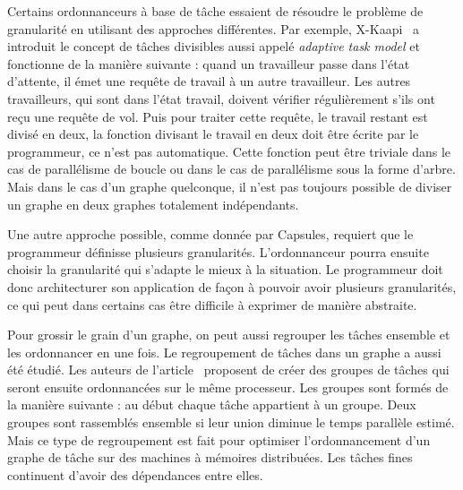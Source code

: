 Certains ordonnanceurs à base de tâche essaient de résoudre le problème de granularité en utilisant des approches différentes.
%
Par exemple, X-Kaapi~\cite{xkaapi} a introduit le concept de tâches divisibles aussi appelé {\em adaptive task model} et fonctionne de la manière suivante :
%
quand un travailleur passe dans l'état d'attente, il émet une requête de travail à un autre travailleur.
%
Les autres travailleurs, qui sont dans l'état travail, doivent vérifier régulièrement s'ils ont reçu une requête de vol.
%
Puis pour traiter cette requête, le travail restant est divisé en deux, la fonction divisant le travail en deux doit être écrite par le programmeur, ce n'est pas automatique.
%
Cette fonction peut être triviale dans le cas de parallélisme de boucle ou dans le cas de parallélisme sous la forme d'arbre.
%
Mais dans le cas d'un graphe quelconque, il n'est pas toujours possible de diviser un graphe en deux graphes totalement indépendants.

Une autre approche possible, comme donnée par Capsules\cite{capsules}, requiert que le programmeur définisse plusieurs granularités.
%
L'ordonnanceur pourra ensuite choisir la granularité qui s'adapte le mieux à la situation.
%
Le programmeur doit donc architecturer son application de façon à pouvoir avoir plusieurs granularités, ce qui peut dans certains cas être difficile à exprimer de manière abstraite.

Pour grossir le grain d'un graphe, on peut aussi regrouper les tâches ensemble et les ordonnancer en une fois.
%
Le regroupement de tâches dans un graphe a aussi été étudié.
%
Les auteurs de l'article~\cite{clustering_task} proposent de créer des groupes de tâches qui seront ensuite ordonnancées sur le même processeur.
%
Les groupes sont formés de la manière suivante : au début chaque tâche appartient à un groupe.
%
Deux groupes sont rassemblés ensemble si leur union diminue le temps parallèle estimé.
%
Mais ce type de regroupement est fait pour optimiser l'ordonnancement d'un graphe de tâche sur des machines à mémoires distribuées.
%
Les tâches fines continuent d'avoir des dépendances entre elles.
